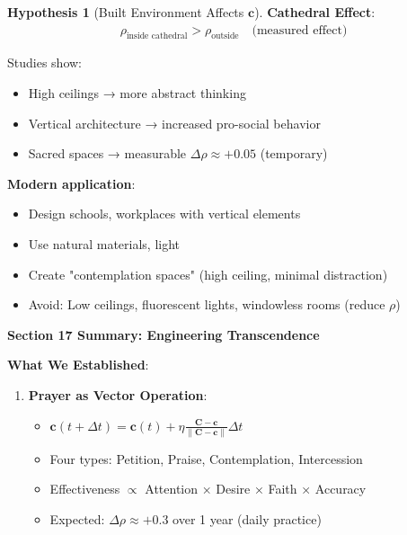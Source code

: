 \documentclass[11pt,a4paper]{article}
\theoremstyle{definition}
\newtheorem{hypothesis}{Hypothesis}[section]
\theoremstyle{remark}
\newcommand{\cc}{\mathbf{c}}
\begin{document}
\begin{small}
\begin{enumerate}
\begin{protocol}
\begin{hypothesis}[Built Environment Affects \(\cc\)]
\textbf{Cathedral Effect}:
\begin{align}
\rho_{\text{inside cathedral}} > \rho_{\text{outside}} \quad \text{(measured effect)}
\end{align}

Studies show:
\begin{itemize}
    \item High ceilings → more abstract thinking
    \item Vertical architecture → increased pro-social behavior
    \item Sacred spaces → measurable \(\Delta\rho \approx +0.05\) (temporary)
\end{itemize}

\textbf{Modern application}:
\begin{itemize}
    \item Design schools, workplaces with vertical elements
    \item Use natural materials, light
    \item Create "contemplation spaces" (high ceiling, minimal distraction)
    \item Avoid: Low ceilings, fluorescent lights, windowless rooms (reduce \(\rho\))
\end{itemize}
\end{hypothesis}

\begin{mdframed}[backgroundcolor=green!10,linewidth=2pt,linecolor=green!70!black]
\textbf{Section 17 Summary: Engineering Transcendence}

\textbf{What We Established}:
\begin{enumerate}[nosep]
    \item \textbf{Prayer as Vector Operation}:
        \begin{itemize}[nosep]
            \item \(\cc(t + \Delta t) = \cc(t) + \eta \frac{\mathbf{C} - \cc}{\|\mathbf{C} - \cc\|} \Delta t\)
            \item Four types: Petition, Praise, Contemplation, Intercession
            \item Effectiveness \(\propto\) Attention × Desire × Faith × Accuracy
            \item Expected: \(\Delta\rho \approx +0.3\) over 1 year (daily practice)
        \end{itemize}
    

\end{enumerate}
\end{mdframed}
\end{protocol}
\end{enumerate}
\end{small}
\end{document}
